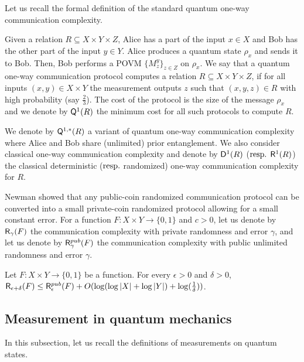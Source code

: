 Let us recall the formal definition of the standard quantum one-way communication complexity.

\begin{definition}\label{def:Q_one-way}
    Given a relation $R \subseteq X \times Y \times Z$, Alice has a part of the input $x \in X$ and Bob has the other part of the input $y \in Y$. Alice produces a quantum state $\rho_x$ and sends it to Bob. Then, Bob performs a POVM $\{M^y_{z}\}_{z \in Z}$ on $\rho_x$. We say that a quantum one-way communication protocol computes a relation $R \subseteq X \times Y \times Z$, if for all inputs $(x,y) \in X \times Y$ the measurement outputs $z$ such that $(x,y,z) \in R$ with high probability (say $\frac{2}{3}$). The cost of the protocol is the size of the message $\rho_x$ and we denote by $\mathsf{Q}^1(R)$ the minimum cost for all such protocols to compute $R$.
\end{definition}

We denote by $\mathsf{Q}^{1,*}(R)$ a variant of quantum one-way communication complexity where Alice and Bob share (unlimited) prior entanglement. We also consider classical one-way communication complexity and denote by $\mathsf{D}^1(R)$ (${\rm resp.}$ $\mathsf{R}^1(R)$) the classical deterministic (${\rm resp.}$ randomized) one-way communication complexity for $R$.

Newman \cite{New91} showed that any public-coin randomized communication protocol can be converted into a small private-coin randomized protocol allowing for a small constant error. For a function $F:X \times Y \rightarrow \{0,1\}$ and $c>0$, let us denote by $\mathsf{R}_\gamma(F)$ the communication complexity with private randomness and error $\gamma$, and let us denote by $\mathsf{R}_\gamma^{pub}(F)$ the communication complexity with public unlimited randomness and error $\gamma$. 

\begin{fact}
    Let $F: X \times Y \rightarrow \{0,1\}$ be a function. For every $\epsilon>0$ and $\delta>0$, $\mathsf{R}_{\epsilon+\delta} (F) \leq \mathsf{R}_\epsilon^{pub} (F) + O(\log (\log |X| + \log |Y|) + \log (\frac{1}{\delta}))$.
\end{fact}

\subsection{Measurement in quantum mechanics}
In this subsection, let us recall the definitions of measurements on quantum states.


